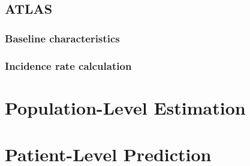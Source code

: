 \documentclass[]{book}
\begin{document}
\section{ATLAS}\label{atlas-1}

\subsection{Baseline characteristics}\label{baseline-characteristics}

\subsection{Incidence rate
calculation}\label{incidence-rate-calculation}

\chapter{Population-Level Estimation}\label{population-level-estimation}

\chapter{Patient-Level Prediction}\label{patient-level-prediction}


\end{document}
